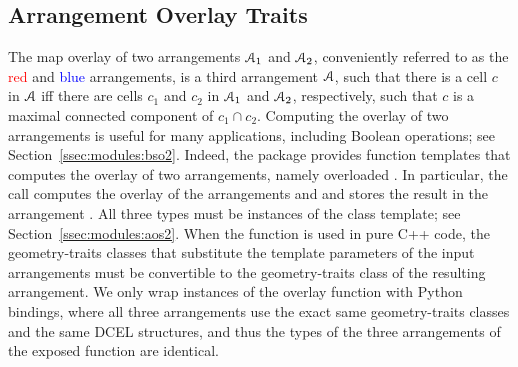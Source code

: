 \subsection{Arrangement Overlay Traits}
\label{sec:code:overlay}
The map overlay of two arrangements ${\cal A}_1$ and ${\cal A}_2$, conveniently referred to as the \textcolor{red}{red} and \textcolor{blue}{blue} arrangements, is a third arrangement ${\cal A}$, such that there is a cell $c$ in ${\cal A}$ iff there are cells $c_1$ and $c_2$ in ${\cal A}_1$ and ${\cal A}_2$, respectively, such that $c$ is a maximal connected component of $c_1 \cap c_2$.
Computing the overlay of two arrangements is useful for many applications, including Boolean operations; see Section~\ref{ssec:modules:bso2}. Indeed, the \iiDArrangementsPackage{} package provides function templates that computes the overlay of two arrangements, namely overloaded . In particular, the call  computes the overlay of the arrangements  and  and stores the result in the arrangement . All three types must be instances of the  class template; see Section~\ref{ssec:modules:aos2}. When the function is used in pure C++ code, the geometry-traits classes that substitute the  template parameters of the input arrangements must be convertible to the geometry-traits class of the resulting arrangement. We only wrap instances of the overlay function with Python bindings, where all three arrangements use the exact same geometry-traits classes and the same DCEL structures, and thus the types of the three arrangements of the exposed  function are identical.

